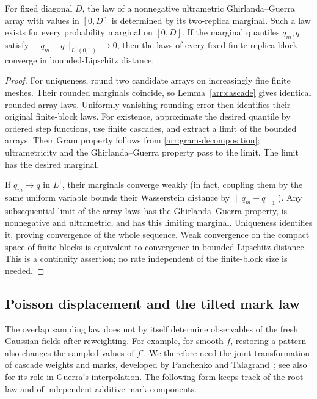 \begin{lemma}
\label{arr:law-continuity}
For fixed diagonal $D$, the law of a nonnegative ultrametric
Ghirlanda--Guerra array with values in $[0,D]$ is determined by its
two-replica marginal.  Such a law exists for every probability marginal
on $[0,D]$.  If the marginal quantiles $q_m,q$ satisfy
$\|q_m-q\|_{L^1(0,1)}\to0$, then the laws of every fixed finite replica
block converge in bounded-Lipschitz distance.
\end{lemma}

\begin{proof}
For uniqueness, round two candidate arrays on increasingly fine finite
meshes.  Their rounded marginals coincide, so
Lemma~\ref{arr:cascade} gives identical rounded array laws.  Uniformly
vanishing rounding error then identifies their original finite-block
laws.  For existence, approximate the desired quantile by ordered step
functions, use finite cascades, and extract a limit of the bounded
arrays.  Their Gram property follows from
\eqref{arr:gram-decomposition}; ultrametricity and the
Ghirlanda--Guerra property pass to the limit.  The limit has the desired
marginal.

If $q_m\to q$ in $L^1$, their marginals converge weakly (in fact, coupling
them by the same uniform variable bounds their Wasserstein distance by
$\|q_m-q\|_1$).  Any subsequential limit of the array laws has the
Ghirlanda--Guerra property, is nonnegative and ultrametric, and has this
limiting marginal.  Uniqueness identifies it, proving convergence of the
whole sequence.  Weak convergence on the compact space of finite blocks
is equivalent to convergence in bounded-Lipschitz distance.  This is a
continuity assertion; no rate independent of the finite-block size is
needed.
\end{proof}

\subsection{Poisson displacement and the tilted mark law}

The overlap sampling law does not by itself determine observables of the
fresh Gaussian fields after reweighting.  For example, for smooth $f$,
restoring a pattern also changes the sampled values of $f'$.  We therefore need
the joint transformation of cascade weights and marks, developed by
Panchenko and Talagrand~\cite[Lemmas~2.1 and~3.1]{panchenkotalagrand2007property};
see also \cite[Section~3]{panchenkotalagrand2007interpolation} for its role in
Guerra's interpolation.  The following form keeps track of the root law
and of independent additive mark components.

